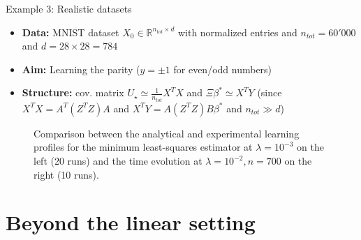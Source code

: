 \documentclass[10pt]{beamer}
\begin{document}
\begin{frame}{Example 3: Realistic datasets} 
  \begin{itemize}
    \item \textbf{Data:} MNIST dataset $X_0 \in \mathbb R^{n_{tot} \times d}$ with normalized entries and $n_{tot}=60'000$ and $d=28\times 28 = 784$
    \item \textbf{Aim:} Learning the parity ($y=\pm1$ for even/odd numbers)
    \item \textbf{Structure:} cov. matrix $U_\star \simeq \frac{1}{n_{tot}} X^TX$ and $\Xi \beta^* \simeq X^TY$ (since $X^TX = A^T (Z^T Z) A$ and $X^T Y = A (Z^T Z) B \beta^*$ and $n_{tot} \gg d$)
  \end{itemize}
  \vspace*{-0.7cm}
  \begin{figure}
    \centering
    \caption{\footnotesize 
        Comparison between the analytical and experimental learning profiles for the minimum least-squares estimator at $\lambda = 10^{-3}$ on the left (20 runs) and the time evolution at $\lambda = 10^{-2}, n=700$ on the right (10 runs).
    }
  \end{figure}
\end{frame}

\section{Beyond the linear setting}
\end{document}

